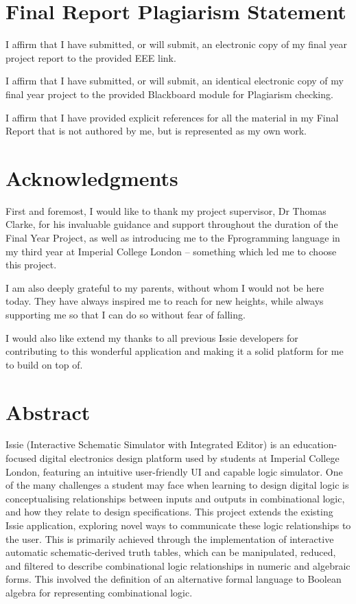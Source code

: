 \clearpage
{}

\section*{\centering Final Report Plagiarism Statement}

I affirm that I have submitted, or will submit, an electronic copy of my final year project report to the provided EEE link.

I affirm that I have submitted, or will submit, an identical electronic copy of my final year project to the provided Blackboard module for Plagiarism checking.

I affirm that I have provided explicit references for all the material in my Final Report that is not authored by me, but is represented as my own work.

\newpage

\section*{\centering Acknowledgments}
First and foremost, I would like to thank my project supervisor, Dr Thomas Clarke, for his invaluable guidance and support throughout the duration of the Final Year Project, as well as introducing me to the F\fsharp programming language in my third year at Imperial College London -- something which led me to choose this project.

I am also deeply grateful to my parents, without whom I would not be here today. They have always inspired me to reach for new heights, while always supporting me so that I can do so without fear of falling.

I would also like extend my thanks to all previous Issie developers for contributing to this wonderful application and making it a solid platform for me to build on top of.

\newpage

\section*{\centering Abstract}
Issie (Interactive Schematic Simulator with Integrated Editor) is an education-focused digital electronics design platform used by students at Imperial College London, featuring an intuitive user-friendly UI and capable logic simulator. One of the many challenges a student may face when learning to design digital logic is conceptualising relationships between inputs and outputs in combinational logic, and how they relate to design specifications. This project extends the existing Issie application, exploring novel ways to communicate these logic relationships to the user. This is primarily achieved through the implementation of interactive automatic schematic-derived truth tables, which can be manipulated, reduced, and filtered to describe combinational logic relationships in numeric and algebraic forms. This involved the definition of an alternative formal language to Boolean algebra for representing combinational logic. 

